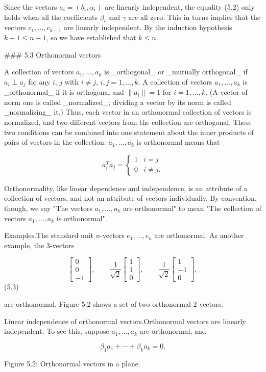 Since the vectors \(a_{i}=(b_{i},\alpha_{i})\) are linearly independent, the equality (5.2) only holds when all the coefficients \(\beta_{i}\) and \(\gamma\) are all zero. This in turns implies that the vectors \(c_{1},\ldots,c_{k-1}\) are linearly independent. By the induction hypothesis \(k-1\leq n-1\), so we have established that \(k\leq n\).

### 5.3 Orthonormal vectors

A collection of vectors \(a_{1},\ldots,a_{k}\) is _orthogonal_ or _mutually orthogonal_ if \(a_{i}\perp a_{j}\) for any \(i\), \(j\) with \(i\neq j\), \(i,j=1,\ldots,k\). A collection of vectors \(a_{1},\ldots,a_{k}\) is _orthonormal_ if it is orthogonal and \(\|a_{i}\|=1\) for \(i=1,\ldots,k\). (A vector of norm one is called _normalized_; dividing a vector by its norm is called _normalizing_ it.) Thus, each vector in an orthonormal collection of vectors is normalized, and two different vectors from the collection are orthogonal. These two conditions can be combined into one statement about the inner products of pairs of vectors in the collection: \(a_{1},\ldots,a_{k}\) is orthonormal means that

\[a_{i}^{T}a_{j}=\left\{\begin{array}{ll}1&i=j\\ 0&i\neq j.\end{array}\right.\]

Orthonormality, like linear dependence and independence, is an attribute of a collection of vectors, and not an attribute of vectors individually. By convention, though, we say "The vectors \(a_{1},\ldots,a_{k}\) are orthonormal" to mean "The collection of vectors \(a_{1},\ldots,a_{k}\) is orthonormal".

Examples.The standard unit \(n\)-vectors \(e_{1},\ldots,e_{n}\) are orthonormal. As another example, the 3-vectors

\[\left[\begin{array}{c}0\\ 0\\ -1\end{array}\right],\qquad\frac{1}{\sqrt{2}}\left[\begin{array}{c}1\\ 1\\ 0\end{array}\right],\qquad\frac{1}{\sqrt{2}}\left[\begin{array}{c}1\\ -1\\ 0\end{array}\right],\] (5.3)

are orthonormal. Figure 5.2 shows a set of two orthonormal 2-vectors.

Linear independence of orthonormal vectors.Orthonormal vectors are linearly independent. To see this, suppose \(a_{1},\ldots,a_{k}\) are orthonormal, and

\[\beta_{1}a_{1}+\cdots+\beta_{k}a_{k}=0.\]

Figure 5.2: Orthonormal vectors in a plane.

 
